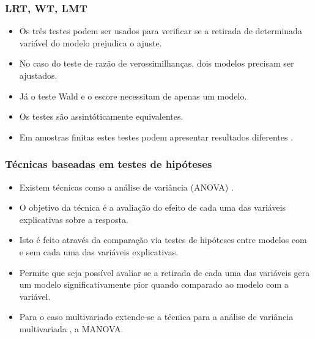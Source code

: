 \documentclass[10pt,
  aspectratio=169,
  serif,
  mathserif,
  professionalfont,
  compress,
  handout,
  ]{beamer}\usepackage[]{graphicx}\usepackage[]{color}
\begin{document}
\begin{frame}
  \frametitle{LRT, WT, LMT}

  \begin{itemize}
    \itemsep 2ex

  \item Os três testes podem ser usados para verificar se a retirada de determinada variável do modelo prejudica o ajuste. 
  
  \item No caso do teste de razão de verossimilhanças, dois modelos precisam ser ajustados. 

  \item Já o teste Wald e o escore necessitam de apenas um modelo. 

  \item Os testes são assintóticamente equivalentes. 

  \item Em amostras finitas estes testes podem apresentar resultados diferentes \cite{conflict}.

  \end{itemize}

\end{frame}


\begin{frame}
  \frametitle{Técnicas baseadas em testes de hipóteses}

  \begin{itemize}
    \itemsep 2ex

  \item Existem técnicas como a análise de variância (ANOVA) \cite{anova_fisher}. 
  
  \item O objetivo da técnica é a avaliação do efeito de cada uma das variáveis explicativas sobre a resposta. 

  \item Isto é feito através da comparação via testes de hipóteses entre modelos com e sem cada uma das variáveis explicativas.

  \item Permite que seja possível avaliar se a retirada de cada uma das variáveis gera um modelo significativamente pior quando comparado ao modelo com a variável. 

  \item Para o caso multivariado extende-se a técnica para a análise de variância multivariada \cite{manova}, a MANOVA. 

  \end{itemize}

\end{frame}
\end{document}
